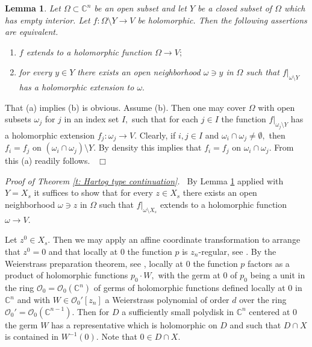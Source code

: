 \documentclass[12pt,a4paper]{article}
\newtheorem{Lemma}[Thm]{Lemma}
\newenvironment{lemma}[0]{\begin{Lemma}\noindent}%
{\end{Lemma}}
\def\proof{\par\noindent{\it Proof.}{\ }{\ }}
\def\qed{~\hfill\hbox{$\Box$}\medbreak}
\def\medno{\medbreak\noindent}
\def\itema{\vspace{-1mm}\item[{\rm (a)}]}
\def\itemb{\item[{\rm (b)}]}
\def\msy#1{{\mathbb #1}}
\def\C{{\msy C}}
\def\to{\rightarrow}
\def\cO{{\mathcal O}}
\numberwithin{Thm}{section}
\numberwithin{equation}{section}
\numberwithin{equation}{section}
\begin{document}
\begin{lemma}
\label{l: observation about extension}
Let $\Omega \subset \C^n$ be an open subset and let $Y$ be a closed subset of $\Omega$ 
which has empty interior. Let $f: \Omega\setminus Y \to V$ be holomorphic. Then the following
assertions are equivalent.
\begin{enumerate}
\itema $f$ extends to a holomorphic function $\Omega \to V;$
\itemb for every $y \in Y$ there exists an open neighborhood $\omega \ni y$ in 
$\Omega$ such that $f|_{\omega \setminus Y}$
has a holomorphic extension to $\omega.$ 
\end{enumerate}
\end{lemma}

\proof 
That (a) implies (b) is obvious. Assume (b). Then one 
may cover $\Omega$ with open subsets 
$\omega_j$ for $j$ in an index set $I,$ such that for each $j\in I$ the function 
$f|_{\omega_j \setminus Y}$ has a holomorphic extension $f_j : \omega_j \to V.$ Clearly, if 
$i,j \in I$ and $\omega_i \cap \omega_j \neq \emptyset,$
then $f_i = f_j$ on $(\omega_i \cap \omega_j)\setminus Y.$ By density this 
implies that $f_i = f_j $ on $\omega_i \cap \omega_j.$ From this (a) readily follows.
\qed

\medno
{\em Proof of Theorem \ref{t: Hartog type continuation}.\ } 
By Lemma  \ref{l: observation about extension} applied with $Y = X_s$ it suffices to show that 
 for every $z \in X_s$ there exists an open neighborhood $\omega \ni z$ in $\Omega$ 
 such that $f|_{\omega \setminus X_s}$ extends to a holomorphic function $\omega \to V.$ 

Let $z^0 \in X_s.$ Then 
we may apply an affine coordinate transformation
to arrange that $z^0 = 0$ and that locally at $0$ the function $p$ is $z_n$-regular,
see \cite[p.~109]{FGhol}. By the Weierstrass preparation theorem, see \cite[Thm.~III.2.7]{FGhol}, locally at $0$ the function $p$ 
factors as a product of holomorphic functions $p_0 \cdot W,$ with the germ at $0$ of $p_0$ being a unit in the
ring $\cO_0 = \cO_0(\C^n)$  of germs of holomorphic functions defined locally at $0$ in $\C^n$ 
and with $W \in \cO_0'[z_n]$ 
a Weierstrass polynomial of order $d$ over the ring $\cO_0' = \cO_0(\C^{n-1}).$ Then for 
$D$ a sufficiently small polydisk in $\C^n$ centered at $0$ the germ $W$ has a representative which is holomorphic
on $D$ and such that $D \cap X$  is contained in $W^{-1}(0).$ Note that $0\in D\cap X.$ 
\end{document}
